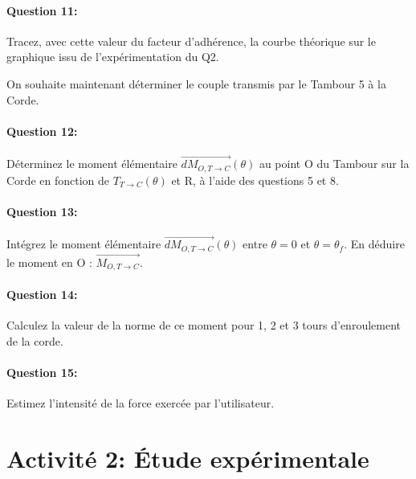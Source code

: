\paragraph{Question 11:} Tracez, avec cette valeur du facteur d'adhérence, la courbe théorique sur le graphique issu de l'expérimentation du Q2. 



On souhaite maintenant déterminer le couple transmis par le Tambour 5 à la Corde.

\paragraph{Question 12:} Déterminez le moment élémentaire $\overrightarrow{dM_{O,T \rightarrow C}}(\theta)$ au point O du Tambour sur la Corde en fonction de $T_{T \rightarrow C}(\theta)$ et R, à l'aide des questions 5 et 8.



\paragraph{Question 13:} Intégrez le moment élémentaire $\overrightarrow{dM_{O,T \rightarrow C}}(\theta)$ entre $\theta=0$ et $\theta=\theta_f$. En déduire le moment en O : $\overrightarrow{M_{O,T \rightarrow C}}$.



\paragraph{Question 14:} Calculez la valeur de la norme de ce moment pour 1, 2 et 3 tours d'enroulement de la corde.



\paragraph{Question 15:} Estimez l'intensité de la force exercée par l'utilisateur.



\cleardoublepage

\section{Activité 2: Étude expérimentale}

